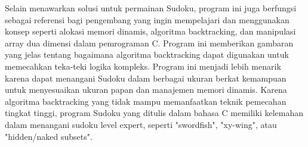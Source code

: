\documentclass{article}
\begin{document}
\par\null\par
\par{Selain menawarkan solusi untuk permainan Sudoku, program ini juga berfungsi sebagai referensi bagi pengembang yang ingin mempelajari dan menggunakan konsep seperti alokasi memori dinamis, algoritma backtracking, dan manipulasi array dua dimensi dalam pemrograman C. Program ini memberikan gambaran yang jelas tentang bagaimana algoritma backtracking dapat digunakan untuk memecahkan teka-teki logika kompleks. Program ini menjadi lebih menarik karena dapat menangani Sudoku dalam berbagai ukuran berkat kemampuan untuk menyesuaikan ukuran papan dan manajemen memori dinamis. Karena algoritma backtracking yang tidak mampu memanfaatkan teknik pemecahan tingkat tinggi, program Sudoku yang ditulis dalam bahasa C memiliki kelemahan dalam menangani sudoku level expert, seperti "swordfish", "xy-wing", atau "hidden/naked subsets".}

\clearpage
\end{document}
